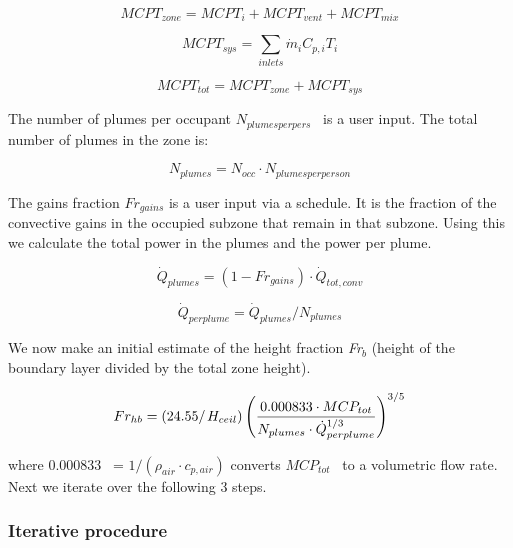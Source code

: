 \begin{equation}
MCP{T_{zone}} = MCP{T_i} + MCP{T_{vent}} + MCP{T_{mix}}
\end{equation}

\begin{equation}
MCP{T_{sys}} = \sum\limits_{inlets} {{{\dot m}_i}} {C_{p,i}}{T_i}
\end{equation}

\begin{equation}
MCP{T_{tot}} = MCP{T_{zone}} + MCP{T_{sys}}
\end{equation}

The number of plumes per occupant \({N_{plumesperpers}}\) ~is a user input. The total number of plumes in the zone is:

\begin{equation}
{N_{plumes}} = {N_{occ}} \cdot {N_{plumesperperson}}
\end{equation}

The gains fraction \(F{r_{gains}}\) is a user input via a schedule. It is the fraction of the convective gains in the occupied subzone that remain in that subzone. Using this we calculate the total power in the plumes and the power per plume.

\begin{equation}
{\dot Q_{plumes}} = (1 - F{r_{gains}}) \cdot {\dot Q_{tot,conv}}
\end{equation}

\begin{equation}
{\dot Q_{perplume}} = {\dot Q_{plumes}}/{N_{plumes}}
\end{equation}

We now make an initial estimate of the height fraction \emph{Fr\(_{b}\)} (height of the boundary layer divided by the total zone height).

\begin{equation}
F{r_{hb}} = \left( {{{24.55} \mathord{\left/ {\vphantom {{24.55} {{H_{ceil}}}}} \right. } {{H_{ceil}}}}} \right){\left( {\frac{{0.000833 \cdot MC{P_{tot}}}}{{{N_{plumes}} \cdot \dot Q_{perplume}^{1/3}}}} \right)^{3/5}}
\end{equation}

where 0.000833~ = \(1/({\rho_{air}} \cdot {c_{p,air}})\) converts \(MC{P_{tot}}\) ~to a volumetric flow rate. Next we iterate over the following 3 steps.

\subsubsection{Iterative procedure}\label{iterative-procedure}


